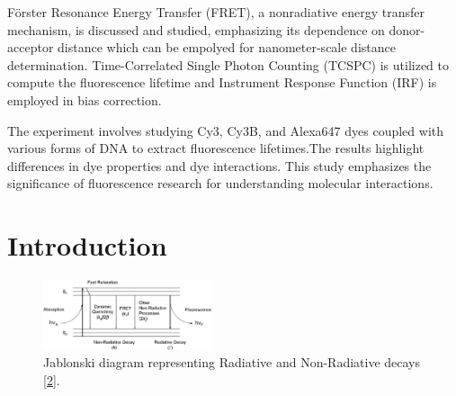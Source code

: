 \documentclass[a4paper,english,12pt,bibliography=totoc]{scrreprt}
\begin{document}
Förster Resonance Energy Transfer (FRET), a nonradiative energy transfer mechanism, is discussed and studied, emphasizing its dependence on donor-acceptor distance which can be empolyed for nanometer-scale distance determination. Time-Correlated Single Photon Counting (TCSPC) is utilized to compute the fluorescence lifetime and  Instrument Response Function (IRF) is employed in bias correction.

The experiment involves studying Cy3, Cy3B, and Alexa647 dyes coupled with various forms of DNA to extract fluorescence lifetimes.The results highlight differences in dye properties and dye interactions. This study emphasizes the significance of fluorescence research for understanding molecular interactions.


\chapter{Introduction}
\label{cha:Introduction}

\begin{figure}
  \centering
  \includegraphics[width=0.44\textwidth]{images/other/A-simplified-Jablonski-diagram-illustrating-the-fluorescence-process-Photons-that-are.png}
  \caption{Jablonski diagram representing Radiative and Non-Radiative decays \hyperref[sec:ref_2]{[2]}.}
\end{figure}
\end{document}
